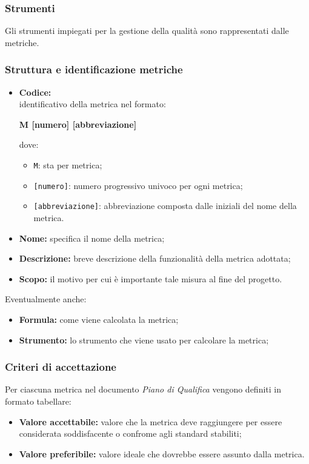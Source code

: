 \subsubsection{Strumenti}
Gli strumenti impiegati per la gestione della qualità sono rappresentati dalle metriche.

\subsubsection{Struttura e identificazione metriche}
\begin{itemize}
    \item \textbf{Codice:} \\
    identificativo della metrica nel formato:
        \begin{center}
            \textbf{M [numero] [abbreviazione]}
        \end{center}
        dove:
        \begin{itemize}
            \item \texttt{M}: sta per metrica;
            \item \texttt{[numero]}: numero progressivo univoco per ogni metrica;
            \item \texttt{[abbreviazione]}: abbreviazione composta dalle iniziali del nome della metrica.
        \end{itemize}
    \item \textbf{Nome:} specifica il nome della metrica;
    \item \textbf{Descrizione:} breve descrizione della funzionalità della metrica adottata;
    \item \textbf{Scopo:} il motivo per cui è importante tale misura al fine del progetto.
\end{itemize}
    \vspace{0.2cm}
Eventualmente anche:
\begin{itemize}
    \item \textbf{Formula:} come viene calcolata la metrica;
    \item \textbf{Strumento:} lo strumento che viene usato per calcolare la metrica;
\end{itemize}

\subsubsection{Criteri di accettazione}
Per ciascuna metrica nel documento \textit{Piano di Qualifica} vengono definiti in formato tabellare:
\begin{itemize}
    \item \textbf{Valore accettabile:} valore che la metrica deve raggiungere per essere considerata soddisfacente o confrome agli standard stabiliti;
    \item \textbf{Valore preferibile:} valore ideale che dovrebbe essere assunto dalla metrica.
\end{itemize}
